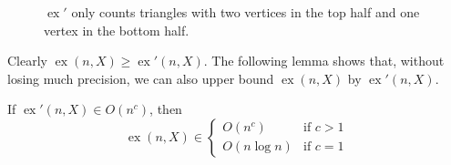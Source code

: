 \documentclass{patmorin}
\DeclareMathOperator{\ex}{ex}
\begin{document}
\begin{figure}
  \caption{$\ex'$ only counts triangles with two vertices in the top half
     and one vertex in the bottom half.}
\end{figure}

Clearly $\ex(n,X)\ge\ex'(n,X)$.  The following lemma shows that, without
losing much precision, we can also upper bound $\ex(n,X)$ by $\ex'(n,X)$.

\begin{lem}
  If $\ex'(n,X)\in O(n^c)$, then
  \[
     \ex(n,X)\in 
        \begin{cases} 
            O(n^c)     & \text{if $c>1$} \\
            O(n\log n) & \text{if $c=1$}
        \end{cases}
  \]
\end{lem}
\end{document}
